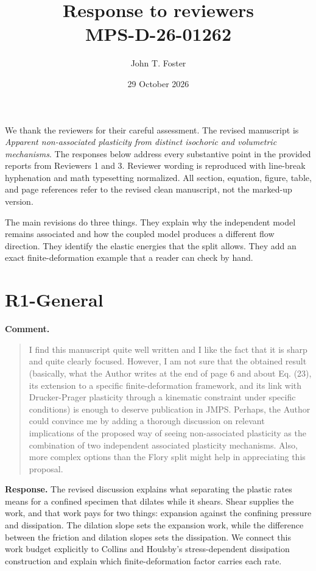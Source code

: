 \documentclass[11pt]{article}
\title{Response to reviewers\\MPS-D-26-01262}
\author{John T. Foster}
\date{29 October 2026}
\begin{document}
\maketitle
We thank the reviewers for their careful assessment. The revised manuscript is
\emph{Apparent non-associated plasticity from distinct isochoric and volumetric
mechanisms}. The responses below address every substantive point in the
provided reports from Reviewers 1 and 3. Reviewer wording is reproduced with
line-break hyphenation and math typesetting normalized. All section, equation, figure, table, and page references
refer to the revised clean manuscript, not the marked-up version.

The main revisions do three things. They explain why the independent model
remains associated and how the coupled model produces a different flow
direction. They identify the elastic energies that the split allows. They add
an exact finite-deformation example that a reader can check by hand.

\section{R1-General}
\textbf{Comment.}\begin{quote}\small
I find this manuscript quite well written and I like the fact that it is sharp and quite clearly focused. However, I am not sure that the obtained result (basically, what the Author writes at the end of page 6 and about Eq. (23), its extension to a specific finite-deformation framework, and its link with Drucker-Prager plasticity through a kinematic constraint under specific conditions) is enough to deserve publication in JMPS. Perhaps, the Author could convince me by adding a thorough discussion on relevant implications of the proposed way of seeing non-associated plasticity as the combination of two independent associated plasticity mechanisms. Also, more complex options than the Flory split might help in appreciating this proposal.
\end{quote}
\textbf{Response.} The revised discussion explains what separating the plastic
rates means for a confined specimen that dilates while it shears. Shear
supplies the work, and that work pays for two things: expansion against the
confining pressure and dissipation. The dilation slope sets the expansion work,
while the difference between the friction and dilation slopes sets the
dissipation. We connect this work budget explicitly to Collins and Houlsby's
stress-dependent dissipation construction and explain which finite-deformation
factor carries each rate.
\end{document}
